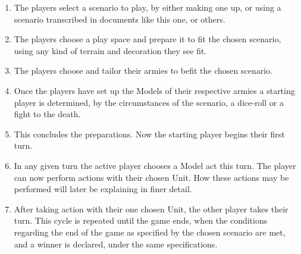 \documentclass[a4paper,12pt]{report}
\begin{document}
\begin{adjustwidth}{-2cm}{-2cm}
\begin{multicols}{2}
\begin{enumerate}

	\item The players select a scenario to play, by either making one up, or using a scenario transcribed in documents like this one, or others.
	\item The players choose a play space and prepare it to fit the chosen scenario, using any kind of terrain and decoration they see fit.
	\item The players choose and tailor their armies to befit the chosen scenario.
 	\item Once the players have set up the Models of their respective armies a starting player is determined, by the circumstances of the scenario, a dice-roll or a fight to the death.
	\item This concludes the preparations. Now the starting player begins their first turn.
	\item In any given turn the active player chooses a Model act this turn. The player can now perform actions with their chosen Unit. How these actions may be performed will later be explaining in finer detail.
	\item After taking action with their one chosen Unit, the other player takes their turn. This cycle is repeated until the game ends, when the conditions regarding the end of the game as specified by the chosen scenario are met, and a winner is declared, under the same specifications.
	
\end{enumerate}
\end{multicols}
\end{adjustwidth}
\end{document}
